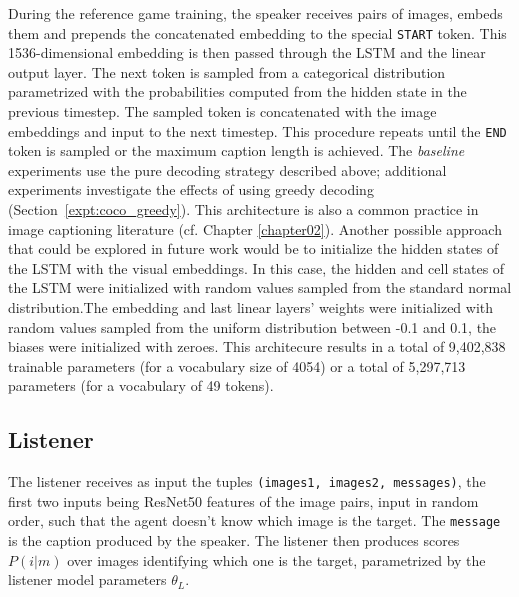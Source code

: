 During the reference game training, the speaker receives pairs of images, embeds them and prepends the concatenated embedding to the special \texttt{START} token. This 1536-dimensional embedding is then passed through the LSTM and the linear output layer. The next token is sampled from a categorical distribution parametrized with the probabilities computed from the hidden state in the previous timestep. The sampled token is concatenated with the image embeddings and input to the next timestep. This procedure repeats until the \texttt{END} token is sampled or the maximum caption length is achieved. The \textit{baseline} experiments use the pure decoding strategy described above; additional experiments investigate the effects of using greedy decoding (Section~\ref{expt:coco_greedy}). This architecture is also a common practice in image captioning literature (cf. Chapter \ref{chapter02}). Another possible approach that could be explored in future work would be to initialize the hidden states of the LSTM with the visual embeddings. In this case, the hidden and cell states of the LSTM were initialized with random values sampled from the standard normal distribution.The embedding and last linear layers' weights were initialized with random values sampled from the uniform distribution between -0.1 and 0.1, the biases were initialized with zeroes.  
This architecure results in a total of 9,402,838 trainable parameters (for a vocabulary  size of 4054) or a total of 5,297,713 parameters (for a vocabulary of 49 tokens).  %

\subsection{Listener}
The listener receives as input the tuples \texttt{(images1, images2, messages)}, the first two inputs being ResNet50 features of the image pairs, input in random order, such that the agent doesn't know which image is the target. The \texttt{message} is the caption produced by the speaker. The listener then produces scores $P(i|m)$ over images identifying which one is the target, parametrized by the listener model parameters $\theta_L$.

